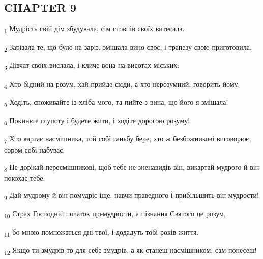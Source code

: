 \subsection{CHAPTER 9}
\begin{tcolorbox}
\textsubscript{1} Мудрість свій дім збудувала, сім стовпів своїх витесала.
\end{tcolorbox}
\begin{tcolorbox}
\textsubscript{2} Зарізала те, що було на заріз, змішала вино своє, і трапезу свою приготовила.
\end{tcolorbox}
\begin{tcolorbox}
\textsubscript{3} Дівчат своїх вислала, і кличе вона на висотах міських:
\end{tcolorbox}
\begin{tcolorbox}
\textsubscript{4} Хто бідний на розум, хай прийде сюди, а хто нерозумний, говорить йому:
\end{tcolorbox}
\begin{tcolorbox}
\textsubscript{5} Ходіть, споживайте із хліба мого, та пийте з вина, що його я змішала!
\end{tcolorbox}
\begin{tcolorbox}
\textsubscript{6} Покиньте глупоту і будете жити, і ходіте дорогою розуму!
\end{tcolorbox}
\begin{tcolorbox}
\textsubscript{7} Хто картає насмішника, той собі ганьбу бере, хто ж безбожникові виговорює, сором собі набуває.
\end{tcolorbox}
\begin{tcolorbox}
\textsubscript{8} Не дорікай пересмішникові, щоб тебе не зненавидів він, викартай мудрого й він покохає тебе.
\end{tcolorbox}
\begin{tcolorbox}
\textsubscript{9} Дай мудрому й він помудріє іще, навчи праведного і прибільшить він мудрости!
\end{tcolorbox}
\begin{tcolorbox}
\textsubscript{10} Страх Господній початок премудрости, а пізнання Святого це розум,
\end{tcolorbox}
\begin{tcolorbox}
\textsubscript{11} бо мною помножаться дні твої, і додадуть тобі років життя.
\end{tcolorbox}
\begin{tcolorbox}
\textsubscript{12} Якщо ти змудрів то для себе змудрів, а як станеш насмішником, сам понесеш!
\end{tcolorbox}
